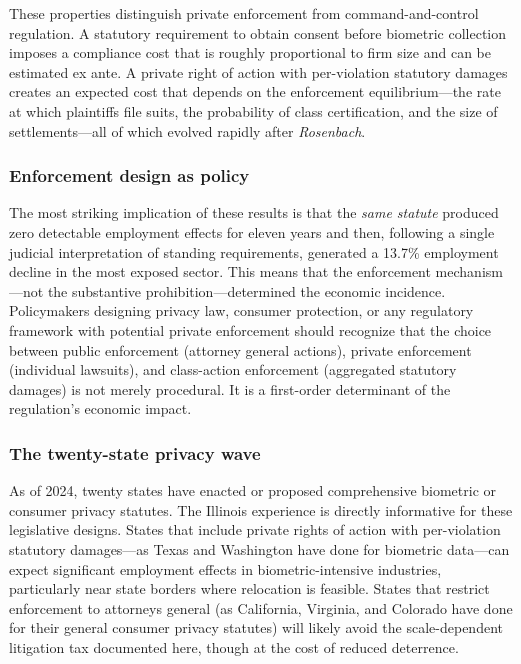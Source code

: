 \documentclass[12pt]{article}
\begin{document}
These properties distinguish private enforcement from command-and-control regulation. A statutory requirement to obtain consent before biometric collection imposes a compliance cost that is roughly proportional to firm size and can be estimated ex ante. A private right of action with per-violation statutory damages creates an expected cost that depends on the enforcement equilibrium---the rate at which plaintiffs file suits, the probability of class certification, and the size of settlements---all of which evolved rapidly after \textit{Rosenbach}.

\subsubsection*{Enforcement design as policy} The most striking implication of these results is that the \textit{same statute} produced zero detectable employment effects for eleven years and then, following a single judicial interpretation of standing requirements, generated a 13.7\% employment decline in the most exposed sector. This means that the enforcement mechanism---not the substantive prohibition---determined the economic incidence. Policymakers designing privacy law, consumer protection, or any regulatory framework with potential private enforcement should recognize that the choice between public enforcement (attorney general actions), private enforcement (individual lawsuits), and class-action enforcement (aggregated statutory damages) is not merely procedural. It is a first-order determinant of the regulation's economic impact.

\subsubsection*{The twenty-state privacy wave} As of 2024, twenty states have enacted or proposed comprehensive biometric or consumer privacy statutes. The Illinois experience is directly informative for these legislative designs. States that include private rights of action with per-violation statutory damages---as Texas and Washington have done for biometric data---can expect significant employment effects in biometric-intensive industries, particularly near state borders where relocation is feasible. States that restrict enforcement to attorneys general (as California, Virginia, and Colorado have done for their general consumer privacy statutes) will likely avoid the scale-dependent litigation tax documented here, though at the cost of reduced deterrence.
\end{document}
